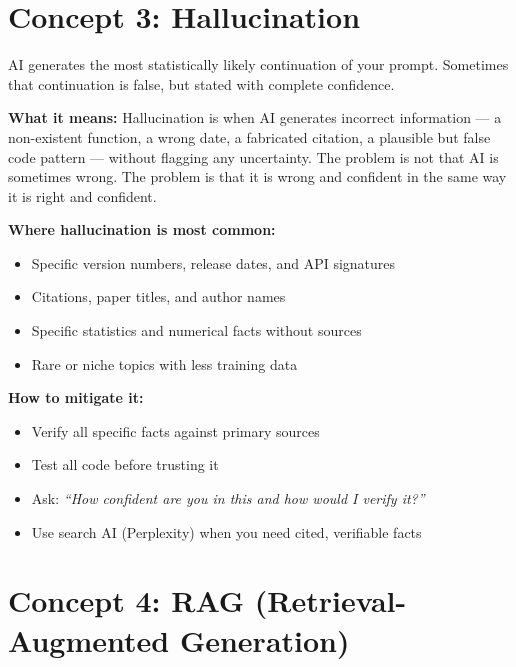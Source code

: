 \section{Concept 3: Hallucination}
\label{sec:hallucination}

\begin{conceptbox}
AI generates the most statistically likely continuation of your prompt.
Sometimes that continuation is false, but stated with complete confidence.
\end{conceptbox}

\textbf{What it means:}
Hallucination is when AI generates incorrect information --- a non-existent function,
a wrong date, a fabricated citation, a plausible but false code pattern --- without
flagging any uncertainty.
The problem is not that AI is sometimes wrong.
The problem is that it is wrong and confident in the same way it is right and confident.

\textbf{Where hallucination is most common:}
\begin{itemize}
  \item Specific version numbers, release dates, and API signatures
  \item Citations, paper titles, and author names
  \item Specific statistics and numerical facts without sources
  \item Rare or niche topics with less training data
\end{itemize}

\textbf{How to mitigate it:}
\begin{itemize}
  \item Verify all specific facts against primary sources
  \item Test all code before trusting it
  \item Ask: \textit{``How confident are you in this and how would I verify it?''}
  \item Use search AI (Perplexity) when you need cited, verifiable facts
\end{itemize}

\section{Concept 4: RAG (Retrieval-Augmented Generation)}
\label{sec:rag}

